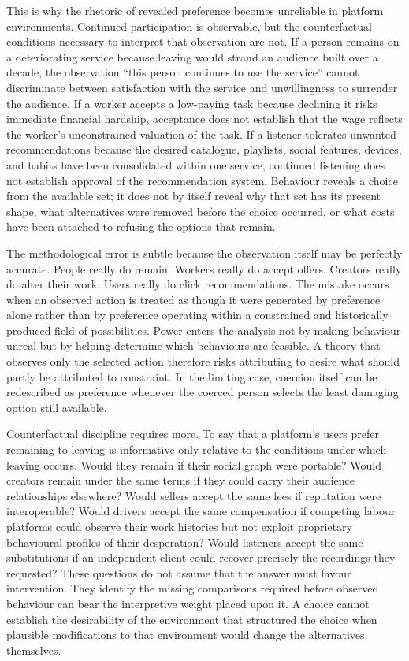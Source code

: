 \documentclass[11pt]{article}
\begin{document}
This is why the rhetoric of revealed preference becomes unreliable in platform environments. Continued participation is observable, but the counterfactual conditions necessary to interpret that observation are not. If a person remains on a deteriorating service because leaving would strand an audience built over a decade, the observation ``this person continues to use the service'' cannot discriminate between satisfaction with the service and unwillingness to surrender the audience. If a worker accepts a low-paying task because declining it risks immediate financial hardship, acceptance does not establish that the wage reflects the worker's unconstrained valuation of the task. If a listener tolerates unwanted recommendations because the desired catalogue, playlists, social features, devices, and habits have been consolidated within one service, continued listening does not establish approval of the recommendation system. Behaviour reveals a choice from the available set; it does not by itself reveal why that set has its present shape, what alternatives were removed before the choice occurred, or what costs have been attached to refusing the options that remain.

The methodological error is subtle because the observation itself may be perfectly accurate. People really do remain. Workers really do accept offers. Creators really do alter their work. Users really do click recommendations. The mistake occurs when an observed action is treated as though it were generated by preference alone rather than by preference operating within a constrained and historically produced field of possibilities. Power enters the analysis not by making behaviour unreal but by helping determine which behaviours are feasible. A theory that observes only the selected action therefore risks attributing to desire what should partly be attributed to constraint. In the limiting case, coercion itself can be redescribed as preference whenever the coerced person selects the least damaging option still available.

Counterfactual discipline requires more. To say that a platform's users prefer remaining to leaving is informative only relative to the conditions under which leaving occurs. Would they remain if their social graph were portable? Would creators remain under the same terms if they could carry their audience relationships elsewhere? Would sellers accept the same fees if reputation were interoperable? Would drivers accept the same compensation if competing labour platforms could observe their work histories but not exploit proprietary behavioural profiles of their desperation? Would listeners accept the same substitutions if an independent client could recover precisely the recordings they requested? These questions do not assume that the answer must favour intervention. They identify the missing comparisons required before observed behaviour can bear the interpretive weight placed upon it. A choice cannot establish the desirability of the environment that structured the choice when plausible modifications to that environment would change the alternatives themselves.
\end{document}
